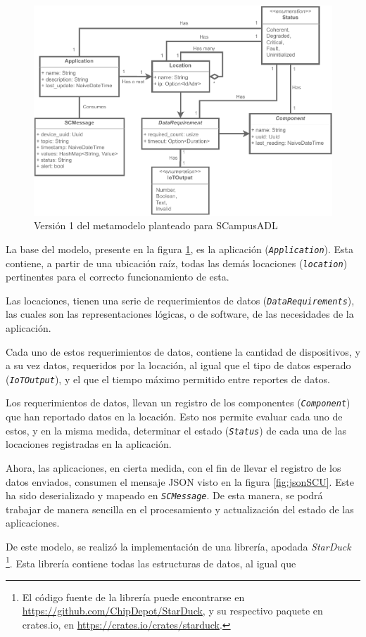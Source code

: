 \begin{figure}[H]
    \centering
    \caption{Versión 1 del metamodelo planteado para SCampusADL}
    \label{fig:metamodelo}
    \vspace{2mm}
    \includegraphics[width=\linewidth]{images/Metamodel B.pdf}
\end{figure}


La base del modelo, presente en la figura \ref{fig:metamodelo}, es la aplicación (\textit{\texttt{Application}}). Esta contiene, a partir de una ubicación raíz, todas las demás locaciones (\textit{\texttt{location}}) pertinentes para el correcto funcionamiento de esta.

Las locaciones, tienen una serie de requerimientos de datos (\texttt{\textit{DataRequirements}}), las cuales son las representaciones lógicas, o de software, de las necesidades de la aplicación.

Cada uno de estos requerimientos de datos, contiene la cantidad de dispositivos, y a su vez datos, requeridos por la locación, al igual que el tipo de datos esperado (\textit{\texttt{IoTOutput}}), y el que el tiempo máximo permitido entre reportes de datos. 

Los requerimientos de datos, llevan un registro de los componentes (\textit{\texttt{Component}}) que han reportado datos en la locación. Esto nos permite evaluar cada uno de estos, y en la misma medida, determinar el estado (\textit{\texttt{Status}}) de cada una de las locaciones registradas en la aplicación.

Ahora, las aplicaciones, en cierta medida, con el fin de llevar el registro de los datos enviados, consumen el mensaje JSON visto en la figura \ref{fig:jsonSCU}. Este ha sido deserializado y mapeado en \textit{\texttt{SCMessage}}. De esta manera, se podrá trabajar de manera sencilla en el procesamiento y actualización del estado de las aplicaciones.

De este modelo, se realizó la implementación de una librería, apodada \textit{StarDuck} \footnote{El código fuente de la librería puede encontrarse en \url{https://github.com/ChipDepot/StarDuck}, y su respectivo paquete en crates.io, en \url{https://crates.io/crates/starduck}.}. Esta librería contiene todas las estructuras de datos, al igual que 